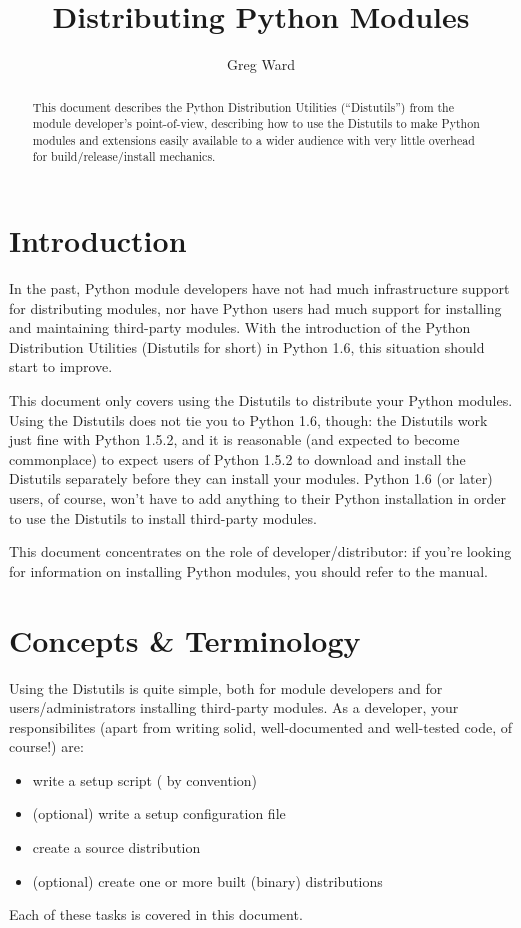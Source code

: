 \documentclass{howto}
\title{Distributing Python Modules}
\author{Greg Ward}
\begin{document}
\maketitle
\begin{abstract}
  \noindent
  This document describes the Python Distribution Utilities
  (``Distutils'') from the module developer's point-of-view, describing
  how to use the Distutils to make Python modules and extensions easily
  available to a wider audience with very little overhead for
  build/release/install mechanics.
\end{abstract}

\tableofcontents

\section{Introduction}
\label{intro}

In the past, Python module developers have not had much infrastructure
support for distributing modules, nor have Python users had much support
for installing and maintaining third-party modules.  With the
introduction of the Python Distribution Utilities (Distutils for short)
in Python 1.6, this situation should start to improve.

This document only covers using the Distutils to distribute your Python
modules.  Using the Distutils does not tie you to Python 1.6, though:
the Distutils work just fine with Python 1.5.2, and it is reasonable
(and expected to become commonplace) to expect users of Python 1.5.2 to
download and install the Distutils separately before they can install
your modules.  Python 1.6 (or later) users, of course, won't have to add
anything to their Python installation in order to use the Distutils to
install third-party modules.

This document concentrates on the role of developer/distributor: if
you're looking for information on installing Python modules, you
should refer to the  manual.


\section{Concepts \& Terminology}
\label{concepts}

Using the Distutils is quite simple, both for module developers and for
users/administrators installing third-party modules.  As a developer,
your responsibilites (apart from writing solid, well-documented and
well-tested code, of course!) are:
\begin{itemize}
\item write a setup script ( by convention)
\item (optional) write a setup configuration file
\item create a source distribution
\item (optional) create one or more built (binary) distributions
\end{itemize}
Each of these tasks is covered in this document.
\end{document}
